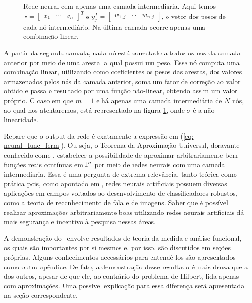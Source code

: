 \begin{figure}[h]
    \begin{center}
        
    \end{center}
    \caption{Rede neural com apenas uma camada intermediária.
    Aqui temos \( x =
    \begin{bmatrix}
        x_{ 1 } & \cdots & x_{ n }
    \end{bmatrix}^{ T } \) e \( y_{ j }^{ T } =
    \begin{bmatrix}
        w_{ 1,j } & \cdots & w_{ n,j }
    \end{bmatrix} \), o vetor dos pesos de cada nó intermediário.
    Na última camada ocorre apenas uma combinação linear.}
    \label{fig: neural_net}
\end{figure}

A partir da segunda camada, cada nó está conectado a todos os nós da camada anterior por meio de uma aresta, a qual possui um peso.
Esse nó computa uma combinação linear, utilizando como coeficientes os pesos das arestas, dos valores armazenados pelos nós da camada anterior, soma um fator de correção ao valor obtido e passa o resultado por uma função não-linear, obtendo assim um valor próprio.
O caso em que \( m = 1 \) e há apenas uma camada intermediária de \( N \) nós, ao qual nos atentaremos, está representado na figura \ref{fig: neural_net}, onde \( \sigma \) é a não-linearidade.


Repare que o output da rede é exatamente a expressão em (\ref{eq: neural_func_form}).
Ou seja, o Teorema da Aproximação Universal, doravante conhecido como \uat , estabelece a possibilidade de aproximar arbitrariamente bem funções reais contínuas em \( \mathbb{I}^{ n } \) por meio de redes neurais com uma camada intermediária.
Essa é uma pergunta de extrema relevância, tanto teórica como prática pois, como apontado em \cite{lipmann}, redes neurais artificiais possuem diversas aplicações em campos voltados ao desenvolvimento de classificadores robustos, como a teoria de reconhecimento de fala e de imagens.
Saber que é possível realizar aproximações arbitrariamente boas utilizando redes neurais artificiais dá mais segurança e incentivo à pesquisa nessas áreas.

A demonstração do \uat \ envolve resultados de teoria da medida e análise funcional, os quais são importantes por si mesmos e, por isso, são discutidos em seções próprias.
Alguns conhecimentos necessários para entendê-los são apresentados como outro apêndice.
De fato, a demonstração desse resultado é mais densa que a dos outros, apesar de que ele, ao contrário do problema de Hilbert, lida apenas com aproximações.
Uma possível explicação para essa diferença será apresentada na seção correspondente.

